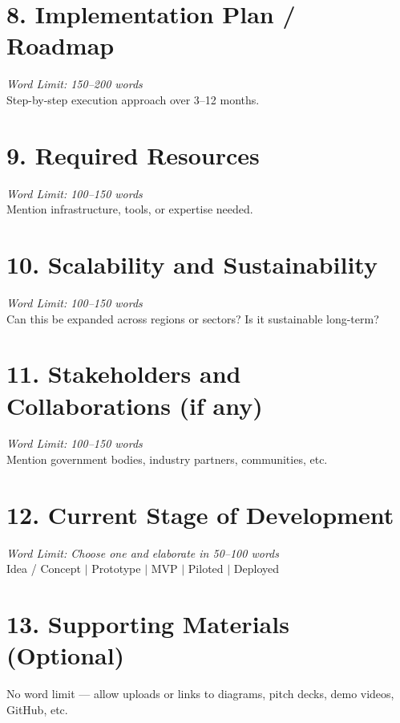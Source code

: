 \documentclass[12pt, a4paper]{article}
\begin{document}
	\vspace{0.8cm}
	
	\section*{\textbf{8. Implementation Plan / Roadmap}}
	\textit{Word Limit: 150–200 words}\\
	Step-by-step execution approach over 3–12 months.
	
	\vspace{0.8cm}
	
	\section*{\textbf{9. Required Resources}}
	\textit{Word Limit: 100–150 words}\\
	Mention infrastructure, tools, or expertise needed.
	
	\vspace{0.8cm}
	
	\section*{\textbf{10. Scalability and Sustainability}}
	\textit{Word Limit: 100–150 words}\\
	Can this be expanded across regions or sectors? Is it sustainable long-term?
	
	\vspace{0.8cm}
	
	\section*{\textbf{11. Stakeholders and Collaborations (if any)}}
	\textit{Word Limit: 100–150 words}\\
	Mention government bodies, industry partners, communities, etc.
	
	\vspace{0.8cm}
	
	\section*{\textbf{12. Current Stage of Development}}
	\textit{Word Limit: Choose one and elaborate in 50–100 words}\\
	Idea / Concept $|$ Prototype $|$ MVP $|$ Piloted $|$ Deployed
	
	\vspace{0.8cm}
	
	\section*{\textbf{13. Supporting Materials (Optional)}}
	No word limit — allow uploads or links to diagrams, pitch decks, demo
	videos, GitHub, etc.
	
\end{document}
